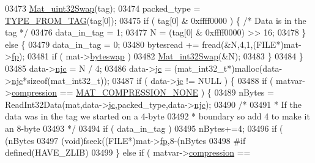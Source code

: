\begin{DoxyCode}
{{{{{{{{{{{{{{{{{{03473                     \hyperlink{endian_8c_a8cb0d0750e2eaf9840d95db531934f4f}{Mat\_uint32Swap}(tag);
03474                 packed\_type = \hyperlink{mat5_8c_a82bacecc4afc633b61bc3dc8ef88d1ed}{TYPE\_FROM\_TAG}(tag[0]);
03475                 \textcolor{keywordflow}{if} ( tag[0] & 0xffff0000 ) \{ \textcolor{comment}{/* Data is in the tag */}
03476                     data\_in\_tag = 1;
03477                     N = (tag[0] & 0xffff0000) >> 16;
03478                 \} \textcolor{keywordflow}{else} \{
03479                     data\_in\_tag = 0;
03480                     bytesread += fread(&N,4,1,(FILE*)mat->\hyperlink{struct__mat__t_a85f562e407ca9ad4d2a6e14f839432b7}{fp});
03481                     \textcolor{keywordflow}{if} ( mat->\hyperlink{struct__mat__t_a99d207977af5e04941ace56d71817a40}{byteswap} )
03482                         \hyperlink{endian_8c_a2e0153996243f0a34df9a5286087cfa3}{Mat\_int32Swap}(&N);
03483                 \}
03484             \}
03485             data->\hyperlink{group___m_a_t_a482d8e4b40aa975f0c1daf146ebe08a4}{njc} = N / 4;
03486             data->\hyperlink{group___m_a_t_ad1e74cdc4f7eff1e47a670297c01da4b}{jc} = (mat\_int32\_t*)malloc(data->\hyperlink{group___m_a_t_a482d8e4b40aa975f0c1daf146ebe08a4}{njc}*\textcolor{keyword}{sizeof}(mat\_int32\_t));
03487             \textcolor{keywordflow}{if} ( data->\hyperlink{group___m_a_t_ad1e74cdc4f7eff1e47a670297c01da4b}{jc} != NULL ) \{
03488                 \textcolor{keywordflow}{if} ( matvar->\hyperlink{group___m_a_t_aeef0466048621cb2c959ba7f6c774d06}{compression} == \hyperlink{group___m_a_t_gga768c318af97bd2567758ecb001ceb7f4a2280b97631ff5dd24dec55261dc587b6}{MAT\_COMPRESSION\_NONE} ) \{
03489                     nBytes = ReadInt32Data(mat,data->\hyperlink{group___m_a_t_ad1e74cdc4f7eff1e47a670297c01da4b}{jc},packed\_type,data->\hyperlink{group___m_a_t_a482d8e4b40aa975f0c1daf146ebe08a4}{njc});
03490                     \textcolor{comment}{/*}
03491 \textcolor{comment}{                     * If the data was in the tag we started on a 4-byte}
03492 \textcolor{comment}{                     * boundary so add 4 to make it an 8-byte}
03493 \textcolor{comment}{                     */}
03494                     \textcolor{keywordflow}{if} ( data\_in\_tag )
03495                         nBytes+=4;
03496                     \textcolor{keywordflow}{if} ( (nBytes %
03497                         (void)fseek((FILE*)mat->\hyperlink{struct__mat__t_a85f562e407ca9ad4d2a6e14f839432b7}{fp},8-(nBytes %
03498 \textcolor{preprocessor}{#if defined(HAVE\_ZLIB)}
03499                 \} \textcolor{keywordflow}{else} \textcolor{keywordflow}{if} ( matvar->\hyperlink{group___m_a_t_aeef0466048621cb2c959ba7f6c774d06}{compression} == 
}}}}}}}}}}}}}}}}}}
\end{DoxyCode}
